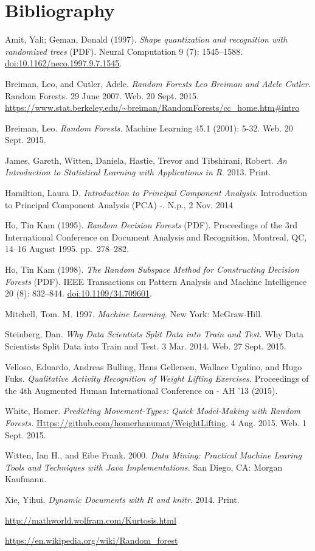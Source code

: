 \documentclass[12pt,twoside]{reedthesis}
\begin{document}
  \chapter{Bibliography}\label{bibliography}
  
  \noindent
  
  \setlength{\parindent}{-0.20in} \setlength{\leftskip}{0.20in}
  \setlength{\parskip}{8pt}
  
  Amit, Yali; Geman, Donald (1997). \emph{Shape quantization and
  recognition with randomized trees} (PDF). Neural Computation 9 (7):
  1545--1588. \url{doi:10.1162/neco.1997.9.7.1545}.
  
  Breiman, Leo, and Cutler, Adele. \emph{Random Forests Leo Breiman and
  Adele Cutler.} Random Forests. 29 June 2007. Web. 20 Sept. 2015.
  \url{https://www.stat.berkeley.edu/~breiman/RandomForests/cc_home.htm\#intro}
  
  Breiman, Leo. \emph{Random Forests.} Machine Learning 45.1 (2001): 5-32.
  Web. 20 Sept. 2015.
  
  James, Gareth, Witten, Daniela, Hastie, Trevor and Tibshirani, Robert.
  \emph{An Introduction to Statistical Learning with Applications in R}.
  2013. Print.
  
  Hamiltion, Laura D. \emph{Introduction to Principal Component Analysis.}
  Introduction to Principal Component Analysis (PCA) -. N.p., 2 Nov. 2014
  
  Ho, Tin Kam (1995). \emph{Random Decision Forests} (PDF). Proceedings of
  the 3rd International Conference on Document Analysis and Recognition,
  Montreal, QC, 14--16 August 1995. pp.~278--282.
  
  Ho, Tin Kam (1998). \emph{The Random Subspace Method for Constructing
  Decision Forests} (PDF). IEEE Transactions on Pattern Analysis and
  Machine Intelligence 20 (8): 832--844. \url{doi:10.1109/34.709601}.
  
  Mitchell, Tom. M. 1997. \emph{Machine Learning.} New York: McGraw-Hill.
  
  Steinberg, Dan. \emph{Why Data Scientists Split Data into Train and
  Test.} Why Data Scientists Split Data into Train and Test. 3 Mar. 2014.
  Web. 27 Sept. 2015.
  
  Velloso, Eduardo, Andreas Bulling, Hans Gellersen, Wallace Ugulino, and
  Hugo Fuks. \emph{Qualitative Activity Recognition of Weight Lifting
  Exercises.} Proceedings of the 4th Augmented Human International
  Conference on - AH '13 (2015).
  
  White, Homer. \emph{Predicting Movement-Types: Quick Model-Making with
  Random Forests.} \url{Https://github.com/homerhanumat/WeightLifting}. 4
  Aug. 2015. Web. 1 Sept. 2015.
  
  Witten, Ian H., and Eibe Frank. 2000. \emph{Data Mining: Practical
  Machine Learing Tools and Techniques with Java Implementations.} San
  Diego, CA: Morgan Kaufmann.
  
  Xie, Yihui. \emph{Dynamic Documents with R and knitr}. 2014. Print.
  
  \url{http://mathworld.wolfram.com/Kurtosis.html}
  
  \url{https://en.wikipedia.org/wiki/Random_forest}
  
  \hypertarget{refs}{}


\end{document}
